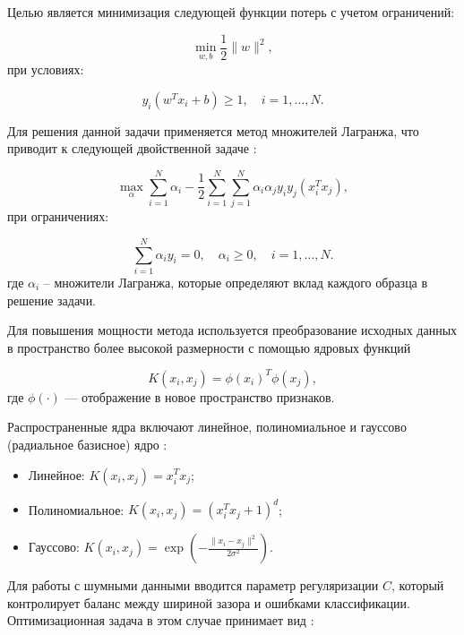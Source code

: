 Целью является минимизация следующей функции потерь с учетом ограничений:

\begin{equation*}
    \min_{w, b} \frac{1}{2} \|w\|^2,
\end{equation*}
при условиях:

\begin{equation*}
    y_i (w^T x_i + b) \geq 1, \quad i = 1, \ldots, N.
\end{equation*}

Для решения данной задачи применяется метод множителей Лагранжа,
что приводит к следующей двойственной задаче \cite{Patle2013}:

\begin{equation*}
    \max_{\alpha} \sum_{i=1}^N \alpha_i - \frac{1}{2} \sum_{i=1}^N \sum_{j=1}^N \alpha_i \alpha_j y_i y_j (x_i^T x_j),
\end{equation*}
при ограничениях:

\begin{equation*}
    \sum_{i=1}^N \alpha_i y_i = 0, \quad \alpha_i \geq 0, \quad i = 1, \ldots, N.
\end{equation*}
где $\alpha_i$ -- множители Лагранжа, которые определяют вклад каждого образца в решение задачи.

Для повышения мощности метода используется преобразование исходных данных
в пространство более высокой размерности с помощью ядровых
функций

\begin{equation*}
    K(x_i, x_j) = \phi(x_i)^T \phi(x_j),
\end{equation*}
где $\phi(\cdot)$ — отображение в новое
пространство признаков.

Распространенные ядра включают линейное,
полиномиальное и гауссово (радиальное базисное) ядро \cite{Deris2011}:

\begin{itemize}
    \item Линейное: $K(x_i, x_j) = x_i^T x_j$;
    \item Полиномиальное: $K(x_i, x_j) = (x_i^T x_j + 1)^d$;
    \item Гауссово: $K(x_i, x_j) = \exp\left(-\frac{\|x_i - x_j\|^2}{2\sigma^2}\right)$.
\end{itemize}

Для работы с шумными данными вводится параметр регуляризации $C$,
который контролирует баланс между шириной зазора и ошибками классификации.
Оптимизационная задача в этом случае принимает вид \cite{Boswell2002}:

